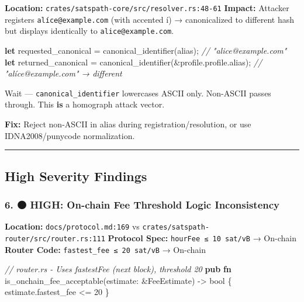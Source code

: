 \documentclass[
]{article}
\newenvironment{Shaded}{}{}
\newcommand{\CommentTok}[1]{\textcolor[rgb]{0.38,0.63,0.69}{\textit{#1}}}
\newcommand{\DataTypeTok}[1]{\textcolor[rgb]{0.56,0.13,0.00}{#1}}
\newcommand{\DecValTok}[1]{\textcolor[rgb]{0.25,0.63,0.44}{#1}}
\newcommand{\KeywordTok}[1]{\textcolor[rgb]{0.00,0.44,0.13}{\textbf{#1}}}
\newcommand{\NormalTok}[1]{#1}
\newcommand{\OperatorTok}[1]{\textcolor[rgb]{0.40,0.40,0.40}{#1}}
\begin{document}
\textbf{Location:} \texttt{crates/satspath-core/src/resolver.rs:48-61}
\textbf{Impact:} Attacker registers \texttt{alíce@example.com} (with
accented í) → canonicalized to different hash but displays identically
to \texttt{alice@example.com}.

\begin{Shaded}
\begin{Highlighting}[]
\KeywordTok{let}\NormalTok{ requested\_canonical }\OperatorTok{=}\NormalTok{ canonical\_identifier(alias)}\OperatorTok{;}  \CommentTok{// "alice@example.com"}
\KeywordTok{let}\NormalTok{ returned\_canonical }\OperatorTok{=}\NormalTok{ canonical\_identifier(}\OperatorTok{\&}\NormalTok{profile}\OperatorTok{.}\NormalTok{profile}\OperatorTok{.}\NormalTok{alias)}\OperatorTok{;}  \CommentTok{// "alíce@example.com" → different}
\end{Highlighting}
\end{Shaded}

Wait --- \texttt{canonical\_identifier} lowercases ASCII only. Non-ASCII
passes through. This \textbf{is} a homograph attack vector.

\textbf{Fix:} Reject non-ASCII in alias during registration/resolution,
or use IDNA2008/punycode normalization.

\begin{center}\rule{0.5\linewidth}{0.5pt}\end{center}

\hypertarget{high-severity-findings}{%
\subsection{High Severity Findings}\label{high-severity-findings}}

\hypertarget{high-on-chain-fee-threshold-logic-inconsistency}{%
\subsubsection{6. 🟠 HIGH: On-chain Fee Threshold Logic
Inconsistency}\label{high-on-chain-fee-threshold-logic-inconsistency}}

\textbf{Location:} \texttt{docs/protocol.md:169} vs
\texttt{crates/satspath-router/src/router.rs:111} \textbf{Protocol
Spec:} \texttt{hourFee\ ≤\ 10\ sat/vB} → On-chain \textbf{Router Code:}
\texttt{fastest\_fee\ ≤\ 20\ sat/vB} → On-chain

\begin{Shaded}
\begin{Highlighting}[]
\CommentTok{// router.rs {-} Uses fastestFee (next block), threshold 20}
\KeywordTok{pub} \KeywordTok{fn}\NormalTok{ is\_onchain\_fee\_acceptable(estimate}\OperatorTok{:} \OperatorTok{\&}\NormalTok{FeeEstimate) }\OperatorTok{{-}\textgreater{}} \DataTypeTok{bool} \OperatorTok{\{}
\NormalTok{    estimate}\OperatorTok{.}\NormalTok{fastest\_fee }\OperatorTok{\textless{}=} \DecValTok{20}
\OperatorTok{\}}
\end{Highlighting}
\end{Shaded}
\end{document}
